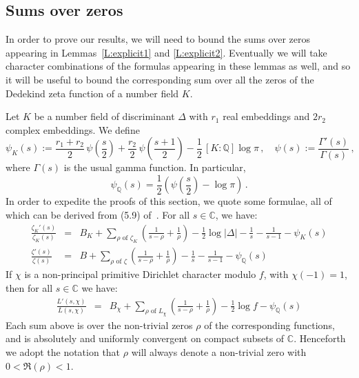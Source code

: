 \documentclass{amsart}
\numberwithin{equation}{section}
\numberwithin{table}{section}
\begin{document}
\subsection{Sums over zeros}\label{S:GRH.nonresidues.zeros}
In order to prove our results, we will need to bound the sums over zeros appearing in
Lemmas~\ref{L:explicit1} and \ref{L:explicit2}.  Eventually we will take character combinations
of the formulas appearing in these lemmas as well, and so it will be useful to bound
the corresponding sum over all the zeros of the Dedekind zeta function of a number field $K$.

Let $K$ be a number field of discriminant $\Delta$ with $r_1$ real embeddings and $2r_2$ complex embeddings.  We define
$$
  \psi_K(s)
  :=
  \frac{r_1+r_2}{2}\,
  \psi\left(\frac{s}{2}\right)
  +
  \frac{r_2}{2}\,
  \psi\left(\frac{s+1}{2}\right)
  -
  \frac{1}{2}\,
  [K:{\mathbb{Q}}]\log \pi
  \,,\quad
  \psi(s):=\frac{\Gamma'(s)}{\Gamma(s)}
  \,,
$$
where $\Gamma(s)$ is the usual gamma function.
In particular,
$$
  \psi_{\mathbb{Q}}(s) = \frac{1}{2}\left(\psi\left(\frac{s}{2}\right)-\log\pi\right)
  \,.
$$
In order to expedite the proofs of this section, we quote some formulae,
all of which can be derived from (5.9) of~\cite{lagarias:1977}.
For all $s\in{\mathbb{C}}$, we have:
\begin{eqnarray}
 \label{E:zetaformula1}
  \frac{\zeta_K'(s)}{\zeta_K(s)}
  &=&
  B_K
  +
  \sum_{\rho\text{ of $\zeta_K$}}
  \left(
  \frac{1}{s-\rho}+\frac{1}{\rho}
  \right)
  -
  \frac{1}{2}
  \log|\Delta|
  -\frac{1}{s}-\frac{1}{s-1}-\psi_K(s)
  \\
   \label{E:zetaformula2}
  \frac{\zeta'(s)}{\zeta(s)}
  &=&
  B
  +
  \sum_{\rho\text{ of $\zeta$}}
  \left(
  \frac{1}{s-\rho}
  +
  \frac{1}{\rho}
  \right)
  -\frac{1}{s}
  -\frac{1}{s-1}
  -\psi_{\mathbb{Q}}(s)
\end{eqnarray}
If $\chi$ is a non-principal primitive Dirichlet character modulo $f$,
with $\chi(-1)=1$, then for all $s\in{\mathbb{C}}$ we have:
\begin{eqnarray}
   \label{E:zetaformula3}
 
    \frac{L'(s,\chi)}{L(s,\chi)}
  &=&
  B_\chi+
  \sum_{\rho\text{ of $L_\chi$}}
  \left(
  \frac{1}{s-\rho}
  +
  \frac{1}{\rho}
  \right)
  -\frac{1}{2}\log f
  -\psi_{\mathbb{Q}}(s)
\end{eqnarray}
Each sum above is over the non-trivial zeros $\rho$ of the corresponding functions,
and is absolutely and uniformly convergent on compact subsets of ${\mathbb{C}}$.
Henceforth we adopt the notation that $\rho$ will always denote a non-trivial zero
with $0<\Re(\rho)<1$.
\end{document}
